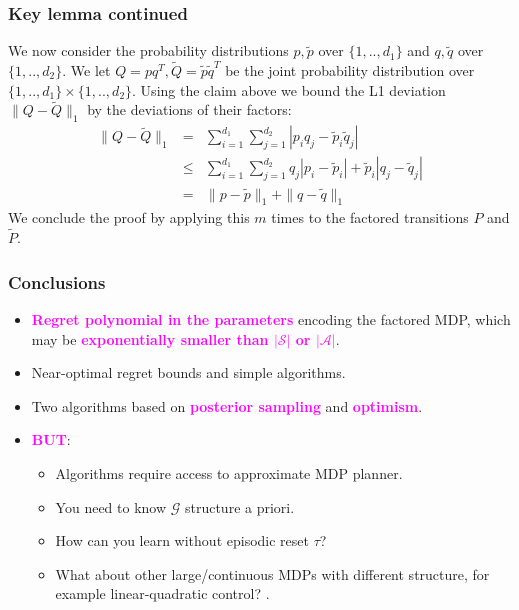 \documentclass{beamer}
\newlength{\wideitemsep}
\let\olditem\item
\renewcommand{\item}{\setlength{\itemsep}{\wideitemsep}\olditem}
\newcommand{\Gc}{\mathcal{G}}
\newcommand{\Sc}{\mathcal{S}}
\newcommand{\Ac}{\mathcal{A}}
\newcommand{\bspace}{\vspace{3mm}}
\newcommand{\hilite}[1]{\textcolor{magenta}{\textbf{#1}}}
\begin{document}
\begin{frame}
\frametitle{Key lemma continued}
We now consider the probability distributions $p, \tilde{p} $ over $\{1,..,d_1\}$ and $q,\tilde{q} $ over $\{1,..,d_2\}$.
We let $Q = p q^T, \tilde{Q} = \tilde{p} \tilde{q}^T$ be the joint probability distribution over $\{1,..,d_1\} \times \{1,..,d_2\}$.
Using the claim above we bound the L1 deviation $\| Q - \tilde{Q} \|_1$ by the deviations of their factors:
\begin{eqnarray*}
    \| Q - \tilde{Q} \|_1 %
    &=& \sum_{i=1}^{d_1} \sum_{j=1}^{d_2} | p_i q_j - \tilde{p}_i \tilde{q}_j | \\
    &\le& \sum_{i=1}^{d_1} \sum_{j=1}^{d_2} q_j | p_i - \tilde{p}_i | + \tilde{p}_i | q_j - \tilde{q}_j | \\
    &=& \| p - \tilde{p} \|_1 + \|q - \tilde{q} \|_1
\end{eqnarray*}
We conclude the proof by applying this $m$ times to the factored transitions $P$ and $\tilde{P}$.
\end{frame}


\begin{frame}
\frametitle{Conclusions}
\begin{itemize}
    \item \hilite{Regret polynomial in the parameters} encoding the factored MDP, which may be \hilite{exponentially smaller than $|\Sc|$ or $|\Ac|$}.
    \bspace
    \item Near-optimal regret bounds and simple algorithms.
    \bspace
    \item Two algorithms based on \hilite{posterior sampling} and \hilite{optimism}.
    \bspace
    \pause
    \item \hilite{BUT}:
    \begin{itemize}
        \item Algorithms require access to approximate MDP planner.
        \item You need to know $\Gc$ structure a priori.
        \item How can you learn without episodic reset $\tau$?
        \item What about other large/continuous MDPs with different structure, for example linear-quadratic control? \cite{osband2014model}.
    \end{itemize}
\end{itemize}
\end{frame}
\end{document}
